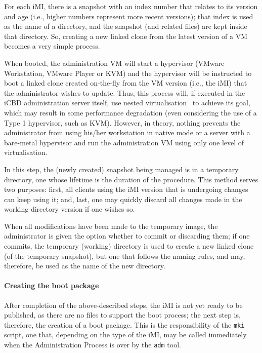 For each iMI, there is a snapshot with an index number that relates to its version and age (i.e., higher numbers represent more recent versions); that index is used as the name of a directory, and the snapshot (and related files) are kept inside that directory. So, creating a new linked clone from the latest version of a VM becomes a very simple process.

When booted, the administration VM will start a hypervisor (VMware Workstation, VMware Player
or KVM) and the hypervisor will be instructed to boot a linked clone created on-the-fly from the VM version (i.e., the iMI) that the administrator wishes to update. Thus, this process will, if executed in the iCBD administration server itself, use nested virtualisation~\cite{kvm_nested} to achieve its goal, which may result in some performance degradation (even considering the use of a Type 1 hypervisor, such as KVM). However, in theory, nothing prevents the administrator from using his/her workstation in native mode or a server with a bare-metal hypervisor and run the administration VM using only one level of virtualisation.

In this step, the (newly created) snapshot being managed is in a temporary directory, one whose lifetime is the duration of the procedure. This method serves two purposes: first, all clients using the iMI version that is undergoing changes can keep using it; and, last, one may quickly discard all changes made in the working directory version if one wishes so.

When all modifications have been made to the temporary image, the administrator is given the option whether to commit or discarding them; if one commits, the temporary (working) directory is used to create a new linked clone (of the temporary snapshot), but one that follows the naming rules, and may, therefore, be used as the name of the new directory.



\paragraph{Creating the boot package}
\label{par:icbd_create_bootpack}

After completion of the above-described steps, the iMI is not yet ready to be published, as there are no files to support the boot process; the next step is, therefore, the creation of a boot package. This is the responsibility of the \texttt{mki} script, one that, depending on the type of the iMI, may be called immediately when the Administration Process is over by the \texttt{adm} tool.

